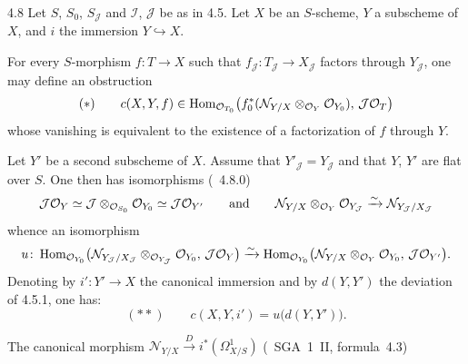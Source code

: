 \begin{proposition}{4.8}
\label{III.4.8}
Let \(S\), \(S_{0}\), \(S_{\mathcal{J}}\) and \(\mathcal{I}\), \(\mathcal{J}\) be as in 4.5.%
{\renewcommand{\thefootnote}{(91)}}
Let \(X\) be an \(S\)-scheme, \(Y\) a subscheme of \(X\), and \(i\) the immersion \(Y\hookrightarrow X\).
\begin{enumeratei}
\item For every \(S\)-morphism \(f\colon T\to X\) such that \(f_{\mathcal{J}}\colon T_{\mathcal{J}}\to X_{\mathcal{J}}\) factors through \(Y_{\mathcal{J}}\), one may define an obstruction
\[
(*)\qquad
c(X,Y,f)
\in
\operatorname{Hom}_{\mathcal{O}_{T_{0}}}\bigl(f_{0}^{*}(\mathcal{N}_{Y/X}\otimes_{\mathcal{O}_{Y}}\mathcal{O}_{Y_{0}}),\,\mathcal{J}\mathcal{O}_{T}\bigr)
\]
whose vanishing is equivalent to the existence of a factorization of \(f\) through \(Y\).
\item Let \(Y'\) be a second subscheme of \(X\). Assume that \(Y'_{\mathcal{J}}=Y_{\mathcal{J}}\) and that \(Y\), \(Y'\) are flat over \(S\). One then has isomorphisms (\cf~4.8.0)
\[
\mathcal{J}\mathcal{O}_{Y}
\simeq
\mathcal{J}\otimes_{\mathcal{O}_{S_{0}}}\mathcal{O}_{Y_{0}}
\simeq
\mathcal{J}\mathcal{O}_{Y'}
\qquad\text{and}\qquad
\mathcal{N}_{Y/X}\otimes_{\mathcal{O}_{Y}}\mathcal{O}_{Y_{\mathcal{J}}}
\xrightarrow{\sim}
\mathcal{N}_{Y_{\mathcal{J}}/X_{\mathcal{J}}}
\]
whence an isomorphism
\[
u\colon
\operatorname{Hom}_{\mathcal{O}_{Y_{0}}}\bigl(\mathcal{N}_{Y_{\mathcal{J}}/X_{\mathcal{J}}}\otimes_{\mathcal{O}_{Y_{\mathcal{J}}}}\mathcal{O}_{Y_{0}},\,\mathcal{J}\mathcal{O}_{Y}\bigr)
\xrightarrow{\sim}
\operatorname{Hom}_{\mathcal{O}_{Y_{0}}}\bigl(\mathcal{N}_{Y/X}\otimes_{\mathcal{O}_{Y}}\mathcal{O}_{Y_{0}},\,\mathcal{J}\mathcal{O}_{Y'}\bigr).
\]
Denoting by \(i'\colon Y'\to X\) the canonical immersion and by \(d(Y,Y')\) the deviation of 4.5.1, one has:%
{\renewcommand{\thefootnote}{(92)}}
\[
(**)\qquad
c(X,Y,i')=u\bigl(d(Y,Y')\bigr).
\]
\item The canonical morphism \(\mathcal{N}_{Y/X}\xrightarrow{D}i^{*}(\Omega^{1}_{X/S})\) (\cf\ SGA~1~II, formula~4.3)%
{\renewcommand{\thefootnote}{(93)}}

\end{enumeratei}
\end{proposition}
